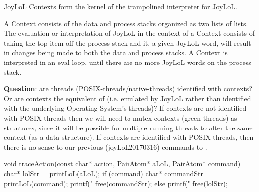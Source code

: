 
\startJoyLoLCoAlg[title=Contexts][contexts]

\srcCopyrightCCBYSA[title={JoyLoL}, url=https://perceptisys.co.uk, 
src=https://github.com/stephengaito/joylol, author={Perceptisys Ltd 
(Stephen Gaito)}, year=2017] 

\targetCopyrightMIT[author={PerceptiSys Ltd (Stephen Gaito)}, year=2017]

\startsection[title=Goals]

JoyLoL Contexts form the kernel of the trampolined interpreter for JoyLoL. 

A Context consists of the data and process stacks organized as two lists 
of lists. The evaluation or interpretation of JoyLoL in the context of a 
Context consists of taking the top item off the process stack and 
 it.  a given JoyLoL word, will result 
in changes being made to both the data and process stacks. A Context is 
interpreted in an eval loop, until there are no more JoyLoL words on the 
process stack. 

{\bf Question}: are threads (POSIX-threads/native-threads) identified with 
contexts? Or are contexts the equivalent of  (i.e. 
 emulated by JoyLoL rather than identified with the 
underlying Operating System's threads)? If contexts are not identified 
with POSIX-threads then we will need to mutex contexts (green threads) as 
 structures, since it will be possible for multiple running 
threads to alter the same context (as a data structure). If contexts are 
identified with POSIX-threads, then there is no sense to our previous 
(joyLoL20170316) commands to . 

\startJoyLoLWord[eval]

\startJoyLoLCode



\stopJoyLoLCode

\startCCode

void traceAction(const char* action, PairAtom* aLoL, PairAtom* command) {
  char* lolStr = printLoL(aLoL);
  if (command) {
    char* commandStr = printLoL(command);
    printf("%
    free(commandStr);
  } else {
    printf("%
  }
  free(lolStr);
}

